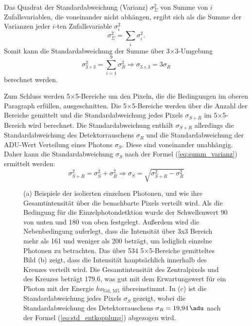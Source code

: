 \noindent
Das Quadrat der Standardabweichung (Varianz) $\sigma_\Sigma^2$ von Summe von $i$ Zufallsvariablen, die voneinander nicht abhängen, ergibt sich als die Summe der Varianzen jeder $i$-ten Zufallsvariable $\sigma_i^2$
\begin{equation}
    \sigma_\Sigma^2 = \sum_{i} \sigma_i^2.
    \label{eq:summ_varianz}
\end{equation}
\noindent
Somit kann die Standardabweichung der Summe über 3$\times$\SI{3}{\px}-Umgebung
\begin{equation}
    \sigma_{3\times 3}^2 = \sum_{i=1}^9\sigma_R^2 \Rightarrow \sigma_{3\times 3} = 3 \sigma_R
\end{equation}
berechnet werden.

\noindent
Zum Schluss werden 5$\times$\SI{5}{\px}-Bereiche um den Pixeln, die die Bedingungen im oberen Paragraph erfüllen, ausgeschnitten. Die 5$\times$\SI{5}{\px}-Bereiche werden über die Anzahl der Bereiche gemittelt und die Standardabweichung jedes Pixels $\sigma_{S+R}$ im 5$\times$\SI{5}{\px}-Bereich wird berechnet. Die Standardabweichung enthält $\sigma_{S+R}$ allerdings die Standardabweichung des Detektorrauschens $\sigma_{R}$ und die Standardabweichung der ADU-Wert Verteilung eines Photons $\sigma_{S}$. Diese sind voneinander unabhängig. Daher kann die Standardabweichung $\sigma_{S}$ nach der Formel (\ref{eq:summ_varianz}) ermittelt werden:
\begin{equation}
    \sigma_{S+R}^2 = \sigma_{S}^2 + \sigma_{R}^2 \Rightarrow \sigma_{S} = \sqrt{\sigma_{S+R}^2 - \sigma_{R}^2}
    \label{eq:std_entkopplung}
\end{equation}
\begin{figure}[H]
    \centering
    
    \caption{(a) Beispiele der isolierten einzelnen Photonen, und wie ihre Gesamtintensität über die benachbarte Pixels verteilt wird. Als die Bedingung für die Einzelphotondetktion wurde der Schwellenwert \SI{90}{\adu} von unten und \SI{180}{\adu} von oben festgelegt. Außerdem wird die Nebenbedingung auferlegt, dass die Intensität über 3x3 Bereich mehr als \SI{161}{\adu} und weniger als \SI{200}{\adu} beträgt, um lediglich einzelne Photonen zu betrachten. Das über 534 5$\times$\SI{5}{\px}-Bereiche gemitteltes Bild (b) zeigt, dass die Intensität hauptsächlich innerhalb des Kreuzes verteilt wird. Die Gesamtintensität des Zentralpixels und des Kreuzes beträgt \SI{179.6}{\adu}, was gut mit dem Erwartungswert für ein Photon mit der Energie $h\nu_\text{Gd, M5}$ übereinstimmt. In (c) ist die Standardabweichung jedes Pixels $\sigma_{S}$ gezeigt, wobei die Standardabweichung des Detektorrauschens $\sigma_R = \SI{19.94}{\adu}$ nach der Formel (\ref{eq:std_entkopplung}) abgezogen wird.}
    \label{fig:examples_average_std_5x5_hotspot}
\end{figure}
